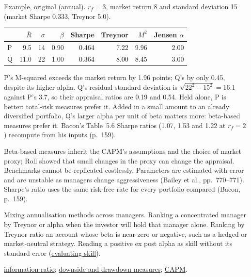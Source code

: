 \begin{qfmethod}
 Example, original (annual). $r_f=3$, market return 8 and standard deviation 15 (market Sharpe 0.333, Treynor 5.0).
\begin{center}\small
\begin{tabular}{@{}lrrrrrrr@{}}
\toprule
 & $\bar R$ & $\sigma$ & $\beta$ & Sharpe & Treynor & $M^2$ & Jensen $\alpha$ \\
\midrule
P & 9.5 & 14 & 0.90 & 0.464 & 7.22 & 9.96 & 2.00 \\
Q & 11.0 & 22 & 1.00 & 0.364 & 8.00 & 8.45 & 3.00 \\
\bottomrule
\end{tabular}
\end{center}
P's M-squared exceeds the market return by 1.96 points; Q's by only 0.45, despite its higher alpha. Q's residual standard deviation is $\sqrt{22^2-15^2}=16.1$ against P's 3.7, so their appraisal ratios are 0.19 and 0.54. Held alone, P is better: total-risk measures prefer it. Added in a small amount to an already diversified portfolio, Q's larger alpha per unit of beta matters more: beta-based measures prefer it. Bacon's Table~5.6 Sharpe ratios (1.07, 1.53 and 1.22 at $r_f=2$) recompute from his inputs (p.~159).

 Beta-based measures inherit the CAPM's assumptions and the choice of market proxy; Roll showed that small changes in the proxy can change the appraisal. Benchmarks cannot be replicated costlessly. Parameters are estimated with error and are unstable as managers change aggressiveness (Bailey et al., pp.~770--771). Sharpe's ratio uses the same risk-free rate for every portfolio compared (Bacon, p.~159).

 Mixing annualisation methods across managers. Ranking a concentrated manager by Treynor or alpha when the investor will hold that manager alone. Ranking by Treynor ratio an account whose beta is near zero or negative, such as a hedged or market-neutral strategy. Reading a positive ex post alpha as skill without its standard error (\hyperref[meth:manager-skill-evaluation]{evaluating skill}).

 \hyperref[meth:active-return-information-ratio]{information ratio}; \hyperref[meth:downside-appraisal-measures]{downside and drawdown measures}; \hyperref[mod:capm-sml]{CAPM}.

\end{qfmethod}

